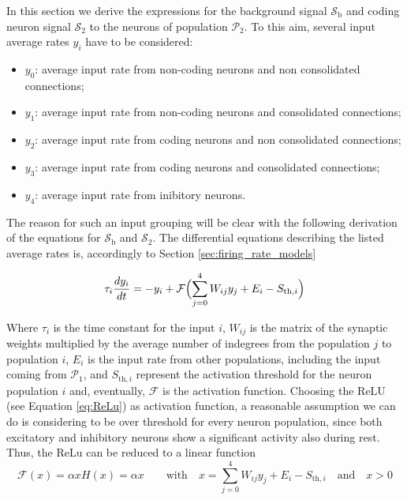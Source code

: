 \documentclass[a4paper, 12pt, twoside, openright]{book}
\newcommand{\popI}{\mathcal{P}_1}
\newcommand{\popII}{\mathcal{P}_2}
\newcommand{\SII}{\mathcal{S}_\text{2}}
\newcommand{\Sb}{\mathcal{S}_\text{b}}
\begin{document}
In this section we derive the expressions for the background signal $\Sb$ and coding neuron signal $\SII$ to the neurons of population $\popII$. To this aim, several input average rates $y_i$ have to be considered:

\begin{itemize}
    \item $y_0$: average input rate from non-coding neurons and non consolidated connections;
    \item $y_1$: average input rate from non-coding neurons and consolidated connections;
    \item $y_2$: average input rate from coding neurons and non consolidated connections;
    \item $y_3$: average input rate from coding neurons and consolidated connections;
    \item $y_4$: average input rate from inibitory neurons.
\end{itemize}

The reason for such an input grouping will be clear with the following derivation of the equations for $\Sb$ and $\SII$. The differential equations describing the listed average rates is, accordingly to Section \ref{sec:firing_rate_models}

\begin{equation}
\label{eq:eq_diff_campo_medio}
    \tau_i \dfrac{d y_i}{dt}= -y_i + \mathcal{F}\Bigl( \sum_{j=0}^{4} W_{ij} y_j+E_i-S_{\text{th},i}\Bigr)
\end{equation}

Where $\tau_i$ is the time constant for the input $i$, $W_{ij}$ is the matrix of the synaptic weights multiplied by the average number of indegrees from the population $j$ to population $i$, $E_i$ is the input rate from other populations, including the input coming from $\popI$, and $S_{\text{th},i}$ represent the activation threshold for the neuron population $i$ and, eventually, $\mathcal{F}$ is the activation function. Choosing the ReLU (see Equation \eqref{eq:ReLu}) as activation function, a reasonable assumption we can do is considering to be over threshold for every neuron population, since both excitatory and inhibitory neurons show a significant activity also during rest. Thus, the ReLu can be reduced to a linear function
\begin{equation}
     \mathcal{F}(x)= \alpha x H(x) = \alpha x  \qquad \text{with} \quad x=\sum_{j=0}^{4} W_{ij} y_j+E_i-S_{\text{th},i} \quad \text{and} \quad x>0
\end{equation}
\end{document}
